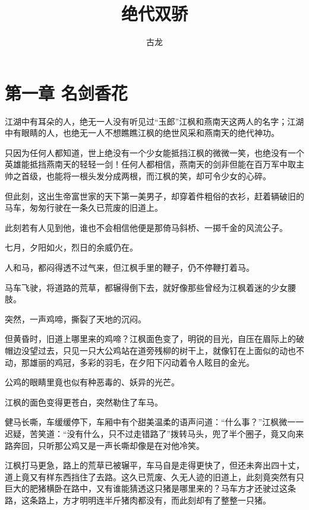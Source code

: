 \documentclass[12pt,oneside]{book}
\title{绝代双骄}
\author{古龙}
\begin{document}

\frontmatter


\setcounter{tocdepth}{2}    
\tableofcontents

\mainmatter


\hypertarget{ux7b2cux4e00ux7ae0-ux540dux5251ux9999ux82b1}{%
\chapter{第一章
名剑香花}\label{ux7b2cux4e00ux7ae0-ux540dux5251ux9999ux82b1}}

江湖中有耳朵的人，绝无一人没有听见过``玉郎''江枫和燕南天这两人的名字；江湖中有眼睛的人，也绝无一人不想瞧瞧江枫的绝世风采和燕南天的绝代神功。

只因为任何人都知道，世上绝没有一个少女能抵挡江枫的微微一笑，也绝没有一个英雄能抵挡燕南天的轻轻一剑！任何人都相信，燕南天的剑非但能在百万军中取主帅之首级，也能将一根头发分成两根，而江枫的笑，却可令少女的心碎。

但此刻，这出生帝富世家的天下第一美男子，却穿着件粗俗的衣衫，赶着辆破旧的马车，匆匆行驶在一条久已荒废的旧道上。

此刻若有人见到他，谁也不会相信他便是那倚马斜桥、一掷千金的风流公子。

七月，夕阳如火，烈日的余威仍在。

人和马，都闷得透不过气来，但江枫手里的鞭子，仍不停鞭打着马。

马车飞驶，将道路的荒草，都辗得倒下去，就好像那些曾经为江枫着迷的少女腰肢。

突然，一声鸡啼，撕裂了天地的沉闷。

但黄昏时，旧道上哪里来的鸡啼？江枫面色变了，明锐的目光，自压在眉际上的破帽边没望过去，只见一只大公鸡站在道旁残柳的树干上，就像钉在上面似的动也不动，那雄丽的鸡冠，多彩的羽毛，在夕阳下闪动着令人眩目的金光。

公鸡的眼睛里竟也似有种恶毒的、妖异的光芒。

江枫的面色变得更苍白，突然勒住了车马。

健马长嘶，车缓缓停下，车厢中有个甜美温柔的语声问道：``什么事？''江枫微一一迟疑，苦笑道：``没有什么，只不过走错路了''拨转马头，兜了半个圈子，竟又向来路奔回，只听那公鸡又是一声长嘶却像是在对他冷笑。

江枫打马更急，路上的荒草已被辗平，车马自是走得更快了，但还未奔出四十丈，道上竟又有样东西挡住了去路。这久已荒废、久无人迹的旧道上，此刻竟突然有只巨大的肥猪横卧在路中，又有谁能猜透这只猪是哪里来的？马车方才还驶过这条路，这条路上，方才明明连半斤猪肉都没有，而此刻却有了整整一只猪。
\end{document}

